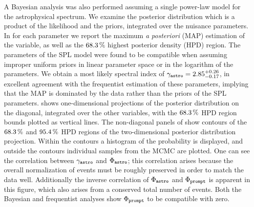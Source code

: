 A Bayesian analysis was also performed assuming a single power-law model for the astrophysical spectrum.
We examine the posterior distribution which is a product of the likelihood and the priors, integrated over the nuisance parameters.
In  for each parameter we report the maximum \textit{a posteriori} (MAP) estimation of the variable, as well as the $\SI{68.3}\percent$ highest posterior density (HPD) region.
The parameters of the SPL model were found to be compatible when assuming improper uniform priors in linear parameter space or in the logarithm of the parameters.
We obtain a most likely spectral index of $\gamma_\texttt{astro}=2.85^{+0.26}_{-0.17}$, in excellent agreement with the frequentist estimation of these parameters, implying that the MAP is dominated by the data rather than the priors of the SPL parameters.
 shows one-dimensional projections of the posterior distribution on the diagonal, integrated over the other variables, with the $\SI{68.3}\percent$ HPD region bounds plotted as vertical lines.
The non-diagonal panels of  show contours of the $\SI{68.3}\percent$ and $\SI{95.4}\percent$ HPD regions of the two-dimensional posterior distribution projection.
Within the contours a histogram of the probability is displayed, and outside the contours individual samples from the MCMC are plotted.
One can see the correlation between $\gamma_\texttt{astro}$ and $\Phi_\texttt{astro}$; this correlation arises because the overall normalization of events must be roughly preserved in order to match the data well.
Additionally the inverse correlation of $\Phi_\texttt{astro}$ and $\Phi_\texttt{prompt}$ is apparent in this figure, which also arises from a conserved total number of events.
Both the Bayesian and frequentist analyses show $\Phi_\texttt{prompt}$ to be compatible with zero.

